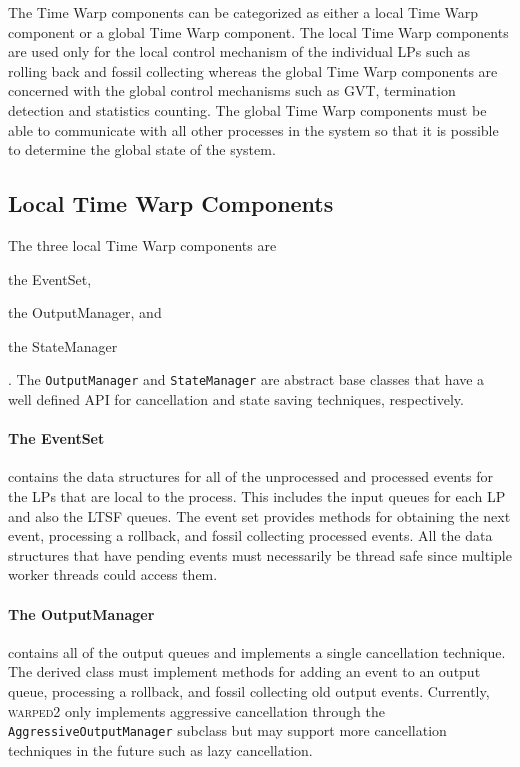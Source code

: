 \documentclass[11pt]{book}
\begin{document}
The Time Warp components can be categorized as either a local Time Warp component or a global Time
Warp component.  The local Time Warp components are used only for the local control mechanism of the
individual LPs such as rolling back and fossil collecting whereas the global Time Warp components
are concerned with the global control mechanisms such as GVT, termination detection and statistics
counting.  The global Time Warp components must be able to communicate with all other processes in
the system so that it is possible to determine the global state of the system.

\subsection{Local Time Warp Components}

The three local Time Warp components are \begin{inparaenum}[(1)] \item the EventSet,
\item the OutputManager, and \item the StateManager\end{inparaenum}.  The \texttt{OutputManager} and
  \texttt{StateManager} are abstract base classes that have a well defined API for cancellation and
  state saving techniques, respectively.

\paragraph{The EventSet} contains the data structures for all of the unprocessed and
processed events for the LPs that are local to the process.  This includes the input queues for each
LP and also the LTSF queues.  The event set provides methods for obtaining the next event,
processing a rollback, and fossil collecting processed events.  All the data structures that have
pending events must necessarily be thread safe since multiple worker threads could access them.

\paragraph{The OutputManager} contains all of the output queues and implements a single
cancellation technique.  The derived class must implement methods for adding an event to an output
queue, processing a rollback, and fossil collecting old output events.  Currently, \textsc{warped2}
only implements aggressive cancellation through the \texttt{AggressiveOutputManager} subclass but
may support more cancellation techniques in the future such as lazy cancellation.
\end{document}
